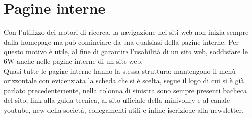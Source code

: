 \section{Pagine interne}
	Con l'utilizzo dei motori di ricerca, la navigazione nei siti web non inizia sempre
	dalla homepage ma può cominciare da una qualsiasi della pagine interne. 
	Per questo motivo è utile, al fine di garantire l'usabilità di un sito web,
	soddisfare le 6W anche nelle pagine interne di un sito web.
	\\
	Quasi tutte le pagine interne hanno la stessa struttura:
	mantengono il menù orizzontale con evidenziata la scheda che si è scelta, segue 
	il logo di cui si è già parlato precedentemente, nella colonna di sinistra sono
	sempre presenti bacheca del sito, link alla guida tecnica, al sito ufficiale
	della minivolley e al canale youtube, new della società, collegamenti utili e 
	infine iscrizione alla newsletter.
	
